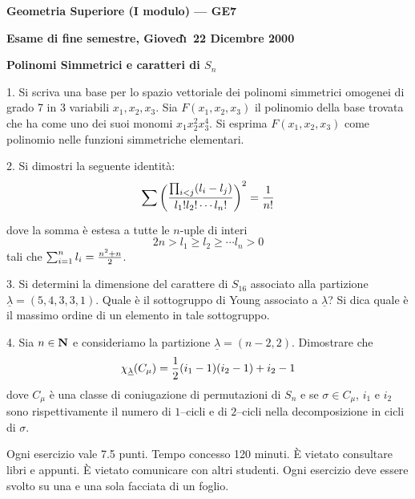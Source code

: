 \nopagenumbers
\centerline{\bf Geometria Superiore (I modulo) --- GE7}
\centerline{\bf Esame di fine semestre, Gioved\`{\i}\ 22 Dicembre 2000}
\centerline{\bf Polinomi Simmetrici e caratteri di $S_n$}
\rm\bigskip

\item{1.} Si scriva una base per lo spazio vettoriale dei polinomi simmetrici
omogenei di grado 7 in 3 variabili $x_1, x_2, x_3$. \hfill\break Sia $F(x_1,x_2,x_3)$ il 
polinomio della base trovata che ha come uno dei suoi monomi $x_1x_2^2x_3^4$. Si esprima 
$F(x_1,x_2,x_3)$ come polinomio nelle funzioni simmetriche elementari.\bigskip 

\item{2.} Si dimostri la seguente identit\`{a}:
$$\sum_{} \left({\prod_{i<j}(l_i-l_j)\over l_1!l_2!\cdots l_n!}\right)^2={1\over n!}$$ 
dove la somma \`{e} estesa a tutte le $n$-uple di interi $$2n>l_1\geq l_2\geq \cdots 
l_n>0$$ tali che $\sum_{i=1}^n l_i={n^2+n\over 2}$. \bigskip 

\item{3.} Si determini la dimensione del carattere di $S_{16}$ associato alla
partizione $\underline{\lambda}=(5,4,3,3,1)$. Quale \`{e} il sottogruppo di Young 
associato a $\underline{\lambda}$? Si dica quale \`{e} il massimo ordine di un elemento 
in tale sottogruppo.\bigskip 

\item{4.} Sia $n\in{\bf N}$ e consideriamo la partizione $\underline{\lambda}=(n-2,2)$.
Dimostrare che $$\chi_{\underline{\lambda}}(C_{\mu})={1\over2}(i_1-1)(i_2-1)+i_2-1$$ dove 
$C_{\mu}$ \`{e} una classe di coniugazione di permutazioni di $S_n$ e se $\sigma\in 
C_{\mu}$, $i_1$ e $i_2$ sono rispettivamente il numero di $1$--cicli e di $2$--cicli 
nella decomposizione in cicli di $\sigma$. 

\bigskip\bigskip

 Ogni esercizio vale 7.5 punti. Tempo concesso 120 minuti. 
\`{E} vietato consultare libri e appunti. 
\`{E} vietato comunicare con altri studenti. Ogni esercizio deve essere svolto
su una e una sola facciata di un foglio.
\bye
